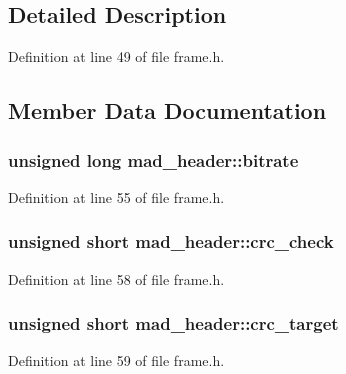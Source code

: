 \subsection{Detailed Description}


Definition at line 49 of file frame.\+h.



\subsection{Member Data Documentation}
\subsubsection[{\texorpdfstring{bitrate}{bitrate}}]{\setlength{\rightskip}{0pt plus 5cm}unsigned long mad\+\_\+header\+::bitrate}\hypertarget{structmad__header_aa26b0a9c946065e7b39df10c4e8f3995}{}\label{structmad__header_aa26b0a9c946065e7b39df10c4e8f3995}


Definition at line 55 of file frame.\+h.

\subsubsection[{\texorpdfstring{crc\+\_\+check}{crc_check}}]{\setlength{\rightskip}{0pt plus 5cm}unsigned short mad\+\_\+header\+::crc\+\_\+check}\hypertarget{structmad__header_a8ea6796703f278702c76098af6ccd762}{}\label{structmad__header_a8ea6796703f278702c76098af6ccd762}


Definition at line 58 of file frame.\+h.

\subsubsection[{\texorpdfstring{crc\+\_\+target}{crc_target}}]{\setlength{\rightskip}{0pt plus 5cm}unsigned short mad\+\_\+header\+::crc\+\_\+target}\hypertarget{structmad__header_a56c1726d166d76d55ee09fb681f1ace9}{}\label{structmad__header_a56c1726d166d76d55ee09fb681f1ace9}


Definition at line 59 of file frame.\+h.

